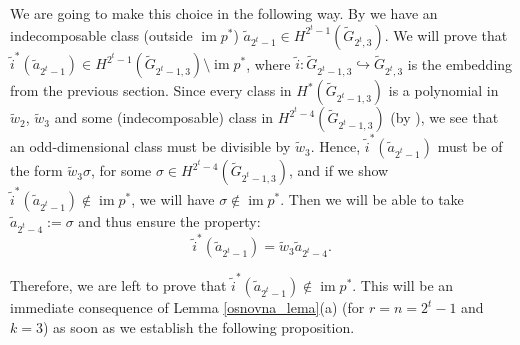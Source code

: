 \documentclass{amsart}
\newcommand{\im}{\operatorname{im}}
\theoremstyle{definition}
\theoremstyle{remark}
\numberwithin{equation}{section}
\begin{document}
We are going to make this choice in the following way. By \cite[Theorem A(a)]{BasuChakraborty} we have an indecomposable class (outside $\im p^*$) $\widetilde a_{2^t-1}\in H^{2^t-1}(\widetilde G_{2^t,3})$. We will prove that $\widetilde i^*(\widetilde a_{2^t-1})\in H^{2^t-1}(\widetilde G_{2^t-1,3})\setminus\im p^*$, where $\widetilde i:\widetilde G_{2^t-1,3}\hookrightarrow\widetilde G_{2^t,3}$ is the embedding from the previous section. Since every class in $H^*(\widetilde G_{2^t-1,3})$ is a polynomial in $\widetilde w_2$, $\widetilde w_3$ and some (indecomposable) class in $H^{2^t-4}(\widetilde G_{2^t-1,3})$ (by \cite[Theorem A(b)]{BasuChakraborty}), we see that an odd-dimensional class must be divisible by $\widetilde w_3$. Hence, $\widetilde i^*(\widetilde a_{2^t-1})$ must be of the form $\widetilde w_3\sigma$, for some $\sigma\in H^{2^t-4}(\widetilde G_{2^t-1,3})$, and if we show $\widetilde i^*(\widetilde a_{2^t-1})\notin\im p^*$, we will have $\sigma\notin\im p^*$. Then we will be able to take $\widetilde a_{2^t-4}:=\sigma$ and thus ensure the property:
\begin{equation}\label{i*2^t-->2^t-1}
\widetilde i^*(\widetilde a_{2^t-1})=\widetilde w_3\widetilde a_{2^t-4}.
\end{equation}

Therefore, we are left to prove that $\widetilde i^*(\widetilde a_{2^t-1})\notin\im p^*$. This will be an immediate consequence of Lemma \ref{osnovna_lema}(a) (for $r=n=2^t-1$ and $k=3$) as soon as we establish the following proposition.
\end{document}
